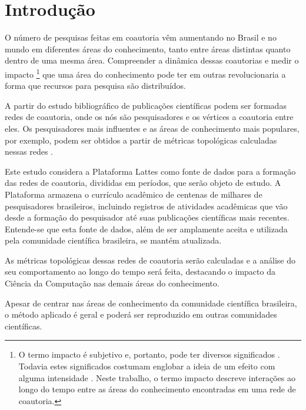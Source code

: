 
\chapter[Introdução]{Introdução}

O número de pesquisas feitas em coautoria vêm aumentando no Brasil \cite{mena2014brazilian} e no mundo \cite{glanzel2003bibliometrics} em diferentes áreas do conhecimento, tanto entre áreas distintas quanto dentro de uma mesma área. Compreender a dinâmica dessas coautorias e medir o impacto \footnote{O termo impacto é subjetivo e, portanto, pode ter diversos significados \cite{roemer2015meaningful}. Todavia estes significados costumam englobar a ideia de um efeito com alguma intensidade \cite{roemer2015meaningful}. Neste trabalho, o termo impacto descreve interações ao longo do tempo entre as áreas do conhecimento encontradas em uma rede de coautoria.} que uma área do conhecimento pode ter em outras revolucionaria a forma que recursos para pesquisa são distribuídos.

A partir do estudo bibliográfico de publicações científicas podem ser formadas redes de coautoria, onde os nós são pesquisadores e os vértices a coautoria entre eles. Os pesquisadores mais influentes e as áreas de conhecimento mais populares, por exemplo, podem ser obtidos a partir de métricas topológicas calculadas nessas redes \cite{franceschet2011collaboration}.

Este estudo considera a Plataforma Lattes como fonte de dados para a formação das redes de coautoria, divididas em períodos, que serão objeto de estudo. A Plataforma armazena o currículo acadêmico de centenas de milhares de pesquisadores brasileiros, incluindo registros de atividades acadêmicas que vão desde a formação do pesquisador até suas publicações científicas mais recentes. Entende-se que esta fonte de dados, além de ser amplamente aceita e utilizada pela comunidade científica brasileira, se mantém atualizada.

As métricas topológicas dessas redes de coautoria serão calculadas e a análise do seu comportamento ao longo do tempo será feita, destacando o impacto da Ciência da Computação nas demais áreas do conhecimento.

Apesar de centrar nas áreas de conhecimento da comunidade científica brasileira, o método aplicado é geral e poderá ser reproduzido em outras comunidades científicas.

